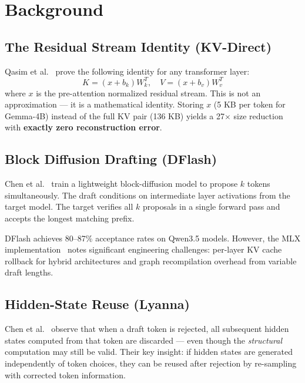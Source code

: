 \documentclass[11pt]{article}
\begin{document}
\section{Background}

\subsection{The Residual Stream Identity (KV-Direct)}

Qasim et al.~\cite{qasim2026kvdirect} prove the following identity for any transformer layer:
\begin{equation}
    K = (x + b_k) W_k^T, \quad V = (x + b_v) W_v^T
\end{equation}
where $x$ is the pre-attention normalized residual stream. This is not an approximation — it is a mathematical identity. Storing $x$ (5 KB per token for Gemma-4B) instead of the full KV pair (136 KB) yields a 27$\times$ size reduction with \textbf{exactly zero reconstruction error}.

\subsection{Block Diffusion Drafting (DFlash)}

Chen et al.~\cite{chen2026dflash} train a lightweight block-diffusion model to propose $k$ tokens simultaneously. The draft conditions on intermediate layer activations from the target model. The target verifies all $k$ proposals in a single forward pass and accepts the longest matching prefix.

DFlash achieves 80--87\% acceptance rates on Qwen3.5 models. However, the MLX implementation~\cite{manjaramkar2026dflashmlx} notes significant engineering challenges: per-layer KV cache rollback for hybrid architectures and graph recompilation overhead from variable draft lengths.

\subsection{Hidden-State Reuse (Lyanna)}

Chen et al.~\cite{chen2026lyanna} observe that when a draft token is rejected, all subsequent hidden states computed from that token are discarded — even though the \textit{structural} computation may still be valid. Their key insight: if hidden states are generated independently of token choices, they can be reused after rejection by re-sampling with corrected token information.
\end{document}
